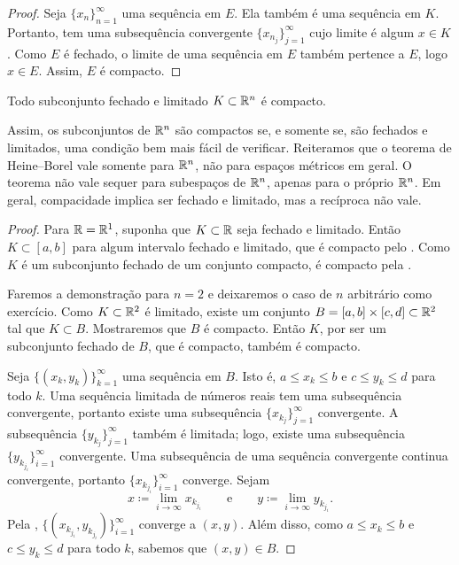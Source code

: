 \begin{proof}
Seja $\{ x_n \}_{n=1}^\infty$ uma sequência em $E$. Ela também é uma
sequência em $K$.
Portanto, tem uma subsequência convergente $\{ x_{n_j} \}_{j=1}^\infty$ cujo
limite é algum $x \in K$. Como $E$ é fechado, o limite de uma sequência em
$E$ também pertence a $E$, logo $x \in E$. Assim, $E$ é compacto.
\end{proof}

\begin{thm}%
\label{thm:msbw}
Todo subconjunto fechado e limitado $K \subset {\mathbb{R}}^n$ é compacto.
\end{thm}

Assim, os subconjuntos de ${\mathbb{R}}^n$ são compactos se, e somente se, são
fechados e limitados, uma condição bem mais fácil de verificar.
Reiteramos que o teorema de Heine--Borel vale somente para ${\mathbb{R}}^n$,
não para espaços métricos em geral.
O teorema não vale sequer para subespaços de ${\mathbb{R}}^n$, apenas para o próprio
${\mathbb{R}}^n$.
Em geral, compacidade implica ser fechado e limitado, mas a recíproca não
vale.

\begin{proof}
Para ${\mathbb{R}} = {\mathbb{R}}^1$, suponha que $K \subset {\mathbb{R}}$ seja fechado e limitado.
Então $K \subset [a,b]$ para algum intervalo fechado e limitado,
que é compacto pelo .
Como $K$ é um subconjunto fechado de um conjunto compacto,
é compacto pela .

Faremos a demonstração para $n=2$ e deixaremos o caso de $n$ arbitrário como exercício.
Como $K \subset {\mathbb{R}}^2$ é limitado, existe um conjunto
$B=[a,b]\times[c,d] \subset {\mathbb{R}}^2$ tal que $K \subset B$. Mostraremos
que $B$ é compacto. Então $K$, por ser um subconjunto fechado de $B$,
que é compacto, também é compacto.

Seja $\bigl\{ (x_k,y_k) \bigr\}_{k=1}^\infty$ uma sequência em $B$. Isto é,
$a \leq x_k \leq b$ e
$c \leq y_k \leq d$ para todo $k$. Uma sequência limitada de números reais
tem uma subsequência convergente, portanto existe uma subsequência
$\{ x_{k_j} \}_{j=1}^\infty$
convergente. A subsequência
$\{ y_{k_j} \}_{j=1}^\infty$ também é limitada; logo, existe uma
subsequência
$\{ y_{k_{j_i}} \}_{i=1}^\infty$ convergente. Uma subsequência de uma
sequência convergente continua convergente, portanto
$\{ x_{k_{j_i}} \}_{i=1}^\infty$ converge.
Sejam
\begin{equation*}
x \coloneqq \lim_{i\to\infty} x_{k_{j_i}}
\qquad \text{e} \qquad
y \coloneqq \lim_{i\to\infty} y_{k_{j_i}} .
\end{equation*}
Pela ,
$\bigl\{ (x_{k_{j_i}},y_{k_{j_i}}) \bigr\}_{i=1}^\infty$ converge a $(x,y)$.
Além disso, como $a \leq x_k \leq b$ e
$c \leq y_k \leq d$ para todo $k$, sabemos que $(x,y) \in B$.
\end{proof}

